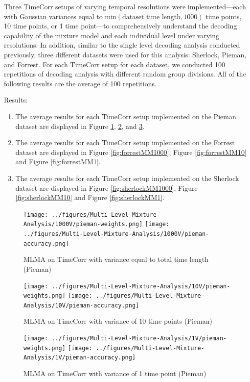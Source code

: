 \documentclass[11pt]{article}
\begin{document}
\begin{enumerate}
Three TimeCorr setups of varying temporal resolutions were implemented---each with Gaussian variances equal to $\text{min}(\text{dataset time length},1000)$ time points, 10 time points, or 1 time point---to comprehensively understand the decoding capability of the mixture model and each individual level under varying resolutions. In addition, similar to the single level decoding analysis conducted previously, three different datasets were used for this analysis: Sherlock, Pieman, and Forrest. For each TimeCorr setup for each dataset, we conducted 100 repetitions of decoding analysis with different random group divisions. All of the following results are the average of 100 repetitions.

Results:
\begin{enumerate}
\item The average results for each TimeCorr setup implemented on the Pieman dataset are displayed in Figure \ref{fig:piemanMM1000}, \ref{fig:piemanMM10}, and \ref{fig:piemanMM1}.
\item The average results for each TimeCorr setup implemented on the Forrest dataset are displayed in Figure \ref{fig:forrestMM1000}, Figure \ref{fig:forrestMM10} and Figure \ref{fig:forrestMM1}.
\item The average results for each TimeCorr setup implemented on the Sherlock dataset are displayed in Figure \ref{fig:sherlockMM1000}, Figure \ref{fig:sherlockMM10} and Figure \ref{fig:sherlockMM1}.
\end{enumerate}

\begin{figure}[!htb]
\caption{MLMA on TimeCorr with variance equal to total time length (Pieman)}
\centering
\texttt{[image: ../figures/Multi-Level-Mixture-Analysis/1000V/pieman-weights.png]}
\texttt{[image: ../figures/Multi-Level-Mixture-Analysis/1000V/pieman-accuracy.png]}
\label{fig:piemanMM1000}
\end{figure}

\begin{figure}[!htb]
\caption{MLMA on TimeCorr with variance of 10 time points (Pieman)}
\centering
\texttt{[image: ../figures/Multi-Level-Mixture-Analysis/10V/pieman-weights.png]}
\texttt{[image: ../figures/Multi-Level-Mixture-Analysis/10V/pieman-accuracy.png]}
\label{fig:piemanMM10}
\end{figure}

\begin{figure}[!htb]
\caption{MLMA on TimeCorr with variance of 1 time point (Pieman)}
\centering
\texttt{[image: ../figures/Multi-Level-Mixture-Analysis/1V/pieman-weights.png]}
\texttt{[image: ../figures/Multi-Level-Mixture-Analysis/1V/pieman-accuracy.png]}
\label{fig:piemanMM1}
\end{figure}


\end{enumerate}
\end{document}
